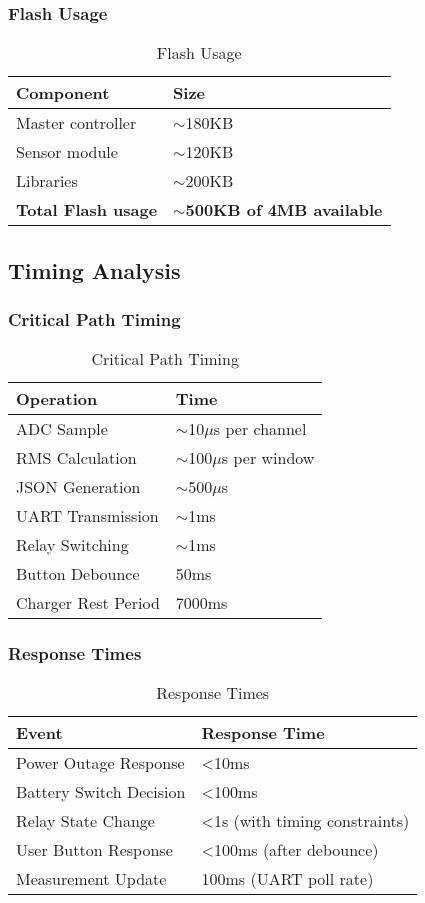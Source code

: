 \documentclass[11pt,a4paper]{article}
\begin{document}
\subsubsection{Flash Usage}
\begin{table}[H]
\centering
\begin{tabular}{@{}ll@{}}
\toprule
Component & Size \\ \midrule
Master controller & $\sim$180KB \\
Sensor module & $\sim$120KB \\
Libraries & $\sim$200KB \\
\textbf{Total Flash usage} & \textbf{$\sim$500KB of 4MB available} \\ \bottomrule
\end{tabular}
\caption{Flash Usage}
\end{table}

\subsection{Timing Analysis}

\subsubsection{Critical Path Timing}
\begin{table}[H]
\centering
\begin{tabular}{@{}ll@{}}
\toprule
Operation & Time \\ \midrule
ADC Sample & $\sim$10$\mu$s per channel \\
RMS Calculation & $\sim$100$\mu$s per window \\
JSON Generation & $\sim$500$\mu$s \\
UART Transmission & $\sim$1ms \\
Relay Switching & $\sim$1ms \\
Button Debounce & 50ms \\
Charger Rest Period & 7000ms \\ \bottomrule
\end{tabular}
\caption{Critical Path Timing}
\end{table}

\subsubsection{Response Times}
\begin{table}[H]
\centering
\begin{tabular}{@{}ll@{}}
\toprule
Event & Response Time \\ \midrule
Power Outage Response & <10ms \\
Battery Switch Decision & <100ms \\
Relay State Change & <1s (with timing constraints) \\
User Button Response & <100ms (after debounce) \\
Measurement Update & 100ms (UART poll rate) \\ \bottomrule
\end{tabular}
\caption{Response Times}
\end{table}
\end{document}
